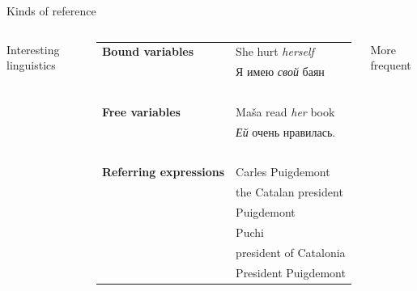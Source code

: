 \documentclass[dvipsnames, 10pt, compress]{beamer}
\begin{document}
\begin{frame}{Kinds of reference}

\begin{columns}





Interesting linguistics 
~\\
~\\

\begin{tabular}{ll}

\textbf{Bound variables} & She hurt \emph{herself} \\
                         & Я имею \emph{свой} баян \\


~ & ~ \\
\textbf{Free variables} & Maša read \emph{her} book \\
                        & \emph{Ей} очень нравилась. \\


~ & ~ \\

\textbf{Referring expressions} & Carles Puigdemont \\
                               & the Catalan president \\
                               & Puigdemont \\ 
                               & Puchi \\ 
                               & president of Catalonia \\
                               & President Puigdemont \\
\end{tabular}

More frequent

\end{columns}

\end{frame}
\end{document}
